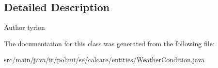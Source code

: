 \subsection{Detailed Description}
\begin{DoxyAuthor}{Author}
tyrion 
\end{DoxyAuthor}


The documentation for this class was generated from the following file\+:\begin{DoxyCompactItemize}
\item 
src/main/java/it/polimi/se/calcare/entities/Weather\+Condition.\+java\end{DoxyCompactItemize}
